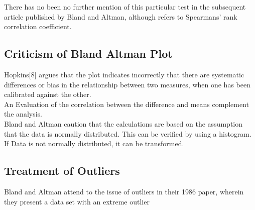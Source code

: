 \documentclass[12pt, a4paper]{report}
\begin{document}
There has no been no further mention of this particular test in
the subsequent article published by Bland and Altman, although
\citet{BA99} refers to Spearmans' rank correlation coefficient.

\subsection{Criticism of Bland Altman Plot}
Hopkins[$8$] argues that the plot indicates incorrectly that there
are systematic differences or bias in the relationship between two
measures, when one has been calibrated against the other.
\\
An Evaluation of the correlation between the difference and means
complement the analysis.
\\
Bland and Altman caution that the calculations are based on the
assumption that the data is normally distributed. This can be
verified by using a histogram. If Data is not normally
distributed, it can be transformed.
\newpage
\subsection{Treatment of Outliers}
Bland and Altman attend to the issue of outliers in their 1986 paper, wherein they present a data set with an extreme outlier
\end{document}
